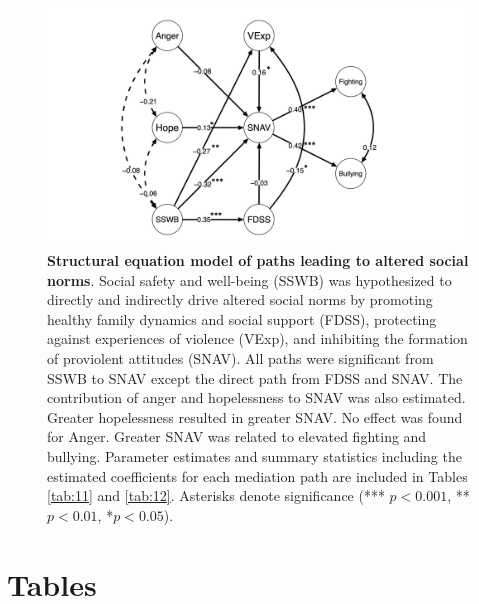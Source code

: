 \documentclass[utf8]{article}
\begin{document}
\begin{figure}[h!]
\includegraphics[width=\textwidth,height=\textheight,keepaspectratio]{Fig-2}
\caption{\textbf{Structural equation model of paths leading to altered social norms}. Social safety and well-being (SSWB) was hypothesized to directly and indirectly drive altered social norms by promoting healthy family dynamics and social support (FDSS), protecting against experiences of violence (VExp), and inhibiting the formation of proviolent attitudes (SNAV). All paths were significant from SSWB to SNAV except the direct path from FDSS and SNAV. The contribution of anger and hopelessness to SNAV was also estimated. Greater hopelessness resulted in greater SNAV. No effect was found for Anger. Greater SNAV was related to elevated fighting and bullying. Parameter estimates and summary statistics including the estimated coefficients for each mediation path are included in Tables \ref{tab:11} and \ref{tab:12}. Asterisks denote significance (*** $p<0.001$, ** $p<0.01$, *$p<0.05$). \label{fig:2}}
\end{figure}

\clearpage
\section*{Tables}
\end{document}
